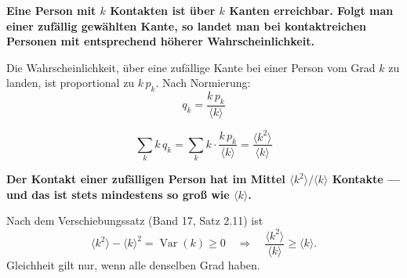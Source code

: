 \begin{merksatz}
\begin{center}
\begin{minipage}{0.9\textwidth}
\textbf{Eine Person mit $k$ Kontakten ist über $k$ Kanten erreichbar. Folgt man einer zufällig gewählten Kante, so landet man bei kontaktreichen Personen mit entsprechend höherer Wahrscheinlichkeit.}
\end{minipage}
\end{center}

Die Wahrscheinlichkeit, über eine zufällige Kante bei einer Person vom Grad $k$ zu landen, ist proportional zu $k\,p_k$. Nach Normierung:
\[ q_k = \frac{k\,p_k}{\langle k\rangle} \]

\[ \sum_k k\,q_k = \sum_k k\cdot\frac{k\,p_k}{\langle k\rangle} = \frac{\langle k^2\rangle}{\langle k\rangle} \]

\begin{center}
\begin{minipage}{0.9\textwidth}
\textbf{Der Kontakt einer zufälligen Person hat im Mittel $\langle k^2\rangle/\langle k\rangle$ Kontakte --- und das ist stets mindestens so groß wie $\langle k\rangle$.}
\end{minipage}
\end{center}

Nach dem Verschiebungssatz (Band 17, Satz 2.11) ist
\[ \langle k^2\rangle - \langle k\rangle^2 = \operatorname{Var}(k) \ge 0 \quad\Longrightarrow\quad \frac{\langle k^2\rangle}{\langle k\rangle} \ge \langle k\rangle . \]
Gleichheit gilt nur, wenn alle denselben Grad haben.

\begin{center}
\begin{minipage}{0.88\textwidth}
\end{minipage}
\end{center}
\end{merksatz}

